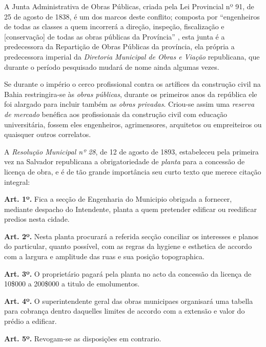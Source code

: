 A Junta Administrativa de Obras Públicas, criada pela Lei Provincial nº 91, de 25 de agosto de 1838, é um dos marcos deste conflito; composta por ``engenheiros de todas as classes a quem incorrerá a direção, inspeção, fiscalização e [conservação] de todas as obras públicas da Província'' \cite[pp.~244-245]{REIS2012}, esta junta é a predecessora da Repartição de Obras Públicas da província, ela própria a predecessora imperial da \textit{Diretoria Municipal de Obras e Viação} republicana, que durante o período pesquisado mudará de nome ainda algumas vezes.

Se durante o império o cerco profissional contra os artífices da construção civil na Bahia restringira-se às \textit{obras públicas}, durante os primeiros anos da república ele foi alargado para incluir também as \textit{obras privadas}. Criou-se assim uma \textit{reserva de mercado} benéfica aos profissionais da construção civil com educação universitária, fossem eles engenheiros, agrimensores, arquitetos ou empreiteiros ou quaisquer outros correlatos.

A \textit{Resolução Municipal nº 28}, de 12 de agosto de 1893, estabeleceu pela primeira vez na Salvador republicana a obrigatoriedade de \textit{planta} para a concessão de licença de obra, e é de tão grande importância seu curto texto que merece citação integral:

\begin{citacao}
\textbf{Art. 1º.} Fica a secção de Engenharia do Municipio obrigada a fornecer, mediante despacho do Intendente, planta a quem pretender edificar ou reedificar predios nesta cidade.

\textbf{Art. 2º.} Nesta planta procurará a referida secção conciliar os interesses e planos do particular, quanto possível, com as regras da hygiene e esthetica de accordo com a largura e amplitude das ruas e sua posição topographica.

\textbf{Art. 3º.} O proprietário pagará pela planta no acto da concessão da licença de 10\$000 a 200\$000 a titulo de emolumentos.

\textbf{Art. 4º.} O superintendente geral das obras municipaes organisará uma tabella para cobrança dentro daquelles limites de accordo com a extensão e valor do prédio a edificar.

\textbf{Art. 5º.} Revogam-se as disposições em contrario.
\end{citacao}


